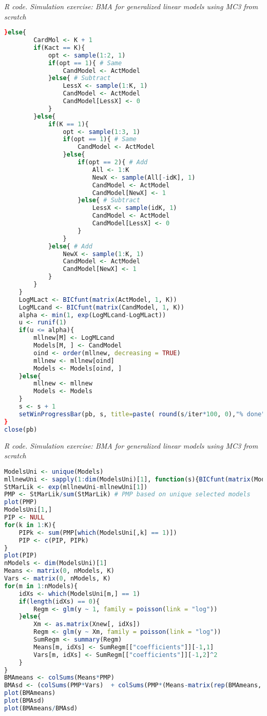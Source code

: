 \begin{tcolorbox}[enhanced,width=4.67in,center upper,
	fontupper=\large\bfseries,drop shadow southwest,sharp corners]
	\textit{R code. Simulation exercise: BMA for generalized linear models using MC3 from scratch}
	\begin{VF}
		\begin{lstlisting}[language=R]
	}else{
		CardMol <- K + 1
		if(Kact == K){
			opt <- sample(1:2, 1)
			if(opt == 1){ # Same
				CandModel <- ActModel
			}else{ # Subtract
				LessX <- sample(1:K, 1)
				CandModel <- ActModel
				CandModel[LessX] <- 0
			}
		}else{
			if(K == 1){
				opt <- sample(1:3, 1)
				if(opt == 1){ # Same
					CandModel <- ActModel
				}else{
					if(opt == 2){ # Add
						All <- 1:K
						NewX <- sample(All[-idK], 1)
						CandModel <- ActModel
						CandModel[NewX] <- 1
					}else{ # Subtract
						LessX <- sample(idK, 1)
						CandModel <- ActModel
						CandModel[LessX] <- 0
					}
				}
			}else{ # Add
				NewX <- sample(1:K, 1)
				CandModel <- ActModel
				CandModel[NewX] <- 1
			}
		}
	}
	LogMLact <- BICfunt(matrix(ActModel, 1, K))
	LogMLcand <- BICfunt(matrix(CandModel, 1, K))
	alpha <- min(1, exp(LogMLcand-LogMLact))
	u <- runif(1)
	if(u <= alpha){
		mllnew[M] <- LogMLcand
		Models[M, ] <- CandModel
		oind <- order(mllnew, decreasing = TRUE)
		mllnew <- mllnew[oind]
		Models <- Models[oind, ]
	}else{
		mllnew <- mllnew
		Models <- Models
	}
	s <- s + 1
	setWinProgressBar(pb, s, title=paste( round(s/iter*100, 0),"% done"))
}
close(pb)
\end{lstlisting}
	\end{VF}
\end{tcolorbox}   
 
\begin{tcolorbox}[enhanced,width=4.67in,center upper,
	fontupper=\large\bfseries,drop shadow southwest,sharp corners]
	\textit{R code. Simulation exercise: BMA for generalized linear models using MC3 from scratch}
	\begin{VF}
		\begin{lstlisting}[language=R]
ModelsUni <- unique(Models)
mllnewUni <- sapply(1:dim(ModelsUni)[1], function(s){BICfunt(matrix(ModelsUni[s,], 1, K))})
StMarLik <- exp(mllnewUni-mllnewUni[1])
PMP <- StMarLik/sum(StMarLik) # PMP based on unique selected models
plot(PMP)
ModelsUni[1,]
PIP <- NULL
for(k in 1:K){
	PIPk <- sum(PMP[which(ModelsUni[,k] == 1)])
	PIP <- c(PIP, PIPk)
}
plot(PIP)
nModels <- dim(ModelsUni)[1]
Means <- matrix(0, nModels, K)
Vars <- matrix(0, nModels, K)
for(m in 1:nModels){
	idXs <- which(ModelsUni[m,] == 1)
	if(length(idXs) == 0){
		Regm <- glm(y ~ 1, family = poisson(link = "log"))
	}else{
		Xm <- as.matrix(Xnew[, idXs])
		Regm <- glm(y ~ Xm, family = poisson(link = "log"))
		SumRegm <- summary(Regm)
		Means[m, idXs] <- SumRegm[["coefficients"]][-1,1]
		Vars[m, idXs] <- SumRegm[["coefficients"]][-1,2]^2 
	}
}
BMAmeans <- colSums(Means*PMP)
BMAsd <- (colSums(PMP*Vars)  + colSums(PMP*(Means-matrix(rep(BMAmeans, each = nModels), nModels, K))^2))^0.5 
plot(BMAmeans)
plot(BMAsd)
plot(BMAmeans/BMAsd)
\end{lstlisting}
	\end{VF}
\end{tcolorbox}   
 


